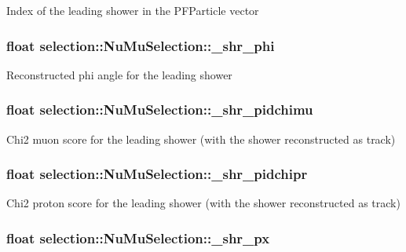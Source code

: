 Index of the leading shower in the P\-F\-Particle vector \hypertarget{classselection_1_1NuMuSelection_a232af76713ec76fb68ce4e878cc3cbea}{
\subsubsection[{\-\_\-shr\-\_\-phi}]{\setlength{\rightskip}{0pt plus 5cm}float selection\-::\-Nu\-Mu\-Selection\-::\-\_\-shr\-\_\-phi\hspace{0.3cm}{\ttfamily [private]}}}\label{classselection_1_1NuMuSelection_a232af76713ec76fb68ce4e878cc3cbea}
Reconstructed phi angle for the leading shower \hypertarget{classselection_1_1NuMuSelection_aba9f56f7c16447322e3108dc91bc3ff0}{
\subsubsection[{\-\_\-shr\-\_\-pidchimu}]{\setlength{\rightskip}{0pt plus 5cm}float selection\-::\-Nu\-Mu\-Selection\-::\-\_\-shr\-\_\-pidchimu\hspace{0.3cm}{\ttfamily [private]}}}\label{classselection_1_1NuMuSelection_aba9f56f7c16447322e3108dc91bc3ff0}
Chi2 muon score for the leading shower (with the shower reconstructed as track) \hypertarget{classselection_1_1NuMuSelection_aaf417a519bc8ecc0d965ac58aff47417}{
\subsubsection[{\-\_\-shr\-\_\-pidchipr}]{\setlength{\rightskip}{0pt plus 5cm}float selection\-::\-Nu\-Mu\-Selection\-::\-\_\-shr\-\_\-pidchipr\hspace{0.3cm}{\ttfamily [private]}}}\label{classselection_1_1NuMuSelection_aaf417a519bc8ecc0d965ac58aff47417}
Chi2 proton score for the leading shower (with the shower reconstructed as track) \hypertarget{classselection_1_1NuMuSelection_a847713ed8d6765bae1c2f6f590af875d}{
\subsubsection[{\-\_\-shr\-\_\-px}]{\setlength{\rightskip}{0pt plus 5cm}float selection\-::\-Nu\-Mu\-Selection\-::\-\_\-shr\-\_\-px\hspace{0.3cm}{\ttfamily [private]}}}\label{classselection_1_1NuMuSelection_a847713ed8d6765bae1c2f6f590af875d}
